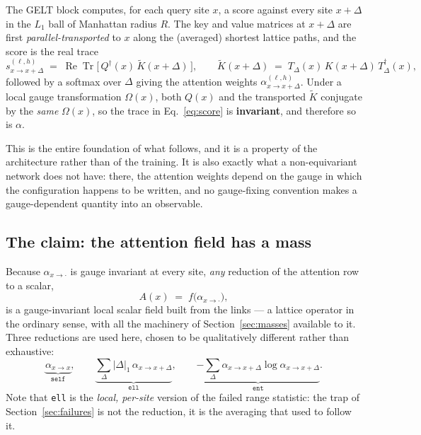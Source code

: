 \documentclass[11pt,a4paper]{article}
\newcommand{\Tr}{\operatorname{Tr}}
\begin{document}
The GELT block computes, for each query site $x$, a score against every site
$x+\Delta$ in the $L_1$ ball of Manhattan radius $R$. The key and value matrices
at $x+\Delta$ are first \emph{parallel-transported} to $x$ along the (averaged)
shortest lattice paths, and the score is the real trace
\begin{equation}
  s^{(\ell,h)}_{x\to x+\Delta}
  \;=\; \operatorname{Re}\Tr\!\big[\, Q^\dagger(x)\, \tilde{K}(x{+}\Delta) \,\big],
  \qquad
  \tilde{K}(x{+}\Delta) \;=\; T_\Delta(x)\, K(x{+}\Delta)\, T_\Delta^\dagger(x),
  \label{eq:score}
\end{equation}
followed by a softmax over $\Delta$ giving the attention weights
$\alpha^{(\ell,h)}_{x\to x+\Delta}$. Under a local gauge transformation
$\Omega(x)$, both $Q(x)$ and the transported $\tilde{K}$ conjugate by the
\emph{same} $\Omega(x)$, so the trace in Eq.~\eqref{eq:score} is
\textbf{invariant}, and therefore so is $\alpha$.

This is the entire foundation of what follows, and it is a property of the
architecture rather than of the training. It is also exactly what a
non-equivariant network does not have: there, the attention weights depend on
the gauge in which the configuration happens to be written, and no gauge-fixing
convention makes a gauge-dependent quantity into an observable.

\subsection{The claim: the attention field has a mass}
\label{sec:claim}

Because $\alpha_{x\to\cdot}$ is gauge invariant at every site, \emph{any}
reduction of the attention row to a scalar,
\begin{equation}
  A(x) \;=\; f\big(\alpha_{x\to\cdot}\big),
  \label{eq:reduction}
\end{equation}
is a gauge-invariant local scalar field built from the links --- a lattice
operator in the ordinary sense, with all the machinery of
Section~\ref{sec:masses} available to it. Three reductions are used here, chosen
to be qualitatively different rather than exhaustive:
\begin{equation}
  \underbrace{\alpha_{x\to x}}_{\texttt{self}},
  \qquad
  \underbrace{\sum_\Delta |\Delta|_1\, \alpha_{x\to x+\Delta}}_{\texttt{ell}},
  \qquad
  \underbrace{-\sum_\Delta \alpha_{x\to x+\Delta}\log\alpha_{x\to x+\Delta}}_{\texttt{ent}}.
\end{equation}
Note that \texttt{ell} is the \emph{local, per-site} version of the failed range
statistic: the trap of Section~\ref{sec:failures} is not the reduction, it is
the averaging that used to follow it.
\end{document}
